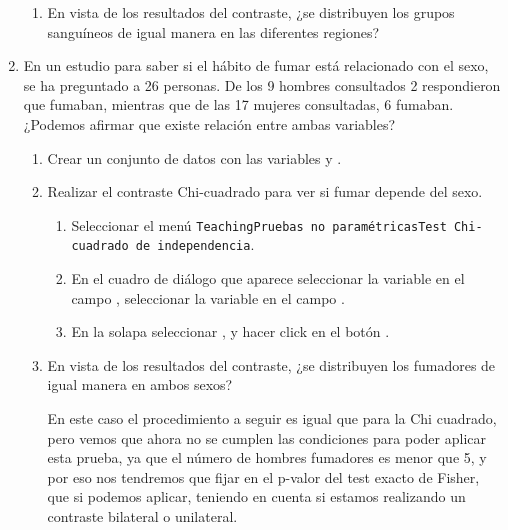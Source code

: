 \begin{enumerate}[leftmargin=*]
\begin{enumerate}
\item En vista de los resultados del contraste, ¿se distribuyen los grupos sanguíneos de igual manera en las diferentes
regiones?
\end{enumerate}

\item En un estudio para saber si el hábito de fumar está relacionado con el sexo, se ha preguntado a 26 personas. De
los 9 hombres consultados 2 respondieron que fumaban, mientras que de las 17 mujeres consultadas, 6 fumaban. ¿Podemos
afirmar que existe relación entre ambas variables?
\begin{enumerate}
\item Crear un conjunto de datos con las variables  y .

\item Realizar el contraste Chi-cuadrado para ver si fumar depende del sexo.  
\begin{indicacion}{
\begin{enumerate}
\item Seleccionar el menú \texttt{Teaching\flecha Pruebas no paramétricas\flecha Test Chi-cuadrado de independencia}.
\item En el cuadro de diálogo que aparece seleccionar la variable  en el campo , seleccionar la variable  en el campo .
\item En la solapa  seleccionar , y hacer click en el
botón .
\end{enumerate}}
\end{indicacion}


\item En vista de los resultados del contraste, ¿se distribuyen los fumadores de igual manera en ambos sexos?
\begin{indicacion}{ En este caso el procedimiento a seguir es igual que para la Chi cuadrado, pero vemos que ahora no se
cumplen las condiciones para poder aplicar esta prueba, ya que el número de hombres fumadores es menor que 5, y por eso
nos tendremos que fijar en el p-valor del test exacto de Fisher, que si podemos aplicar, teniendo en cuenta si estamos
realizando un contraste bilateral o unilateral.}
\end{indicacion}
\end{enumerate}



\end{enumerate}
